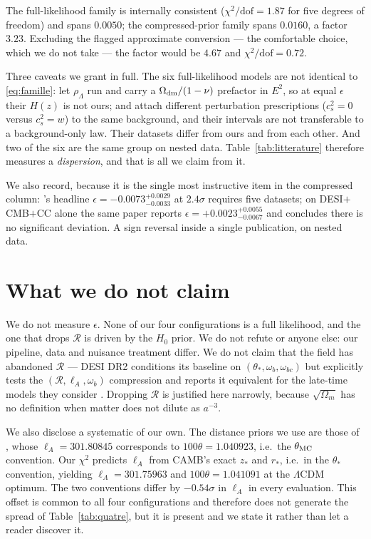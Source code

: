 \documentclass[11pt,a4paper]{article}
\begin{document}
The full-likelihood family is internally consistent ($\chi^2/\mathrm{dof}=1.87$ for five
degrees of freedom) and spans $0.0050$; the compressed-prior family spans $0.0160$, a factor
$3.23$. Excluding the flagged approximate conversion --- the comfortable choice, which we do
not take --- the factor would be $4.67$ and $\chi^2/\mathrm{dof}=0.72$.

Three caveats we grant in full. The six full-likelihood models are not identical to
\eqref{eq:famille}: \citet{tsiapi2019} let $\rho_\Lambda$ run and carry a
$\Omega_{\rm dm}/(1-\nu)$ prefactor in $E^2$, so at equal $\epsilon$ their $H(z)$ is not ours;
\citet{kumar2025} and \citet{yaoliu2025} attach different perturbation prescriptions
($c_s^2=0$ versus $c_s^2=w$) to the same background, and their intervals are not transferable
to a background-only law. Their datasets differ from ours and from each other. And two of the
six are the same group on nested data. Table~\ref{tab:litterature} therefore measures a
\emph{dispersion}, and that is all we claim from it.

We also record, because it is the single most instructive item in the compressed column:
\citet{yang2025}'s headline $\epsilon=-0.0073^{+0.0029}_{-0.0033}$ at $2.4\sigma$ requires
five datasets; on DESI$+$CMB$+$CC alone the same paper reports
$\epsilon=+0.0023^{+0.0055}_{-0.0067}$ and concludes there is no significant deviation. A
sign reversal inside a single publication, on nested data.

\section{What we do not claim}
\label{sec:limites}

We do not measure $\epsilon$. None of our four configurations is a full likelihood, and the
one that drops $\mathcal{R}$ is driven by the $H_0$ prior. We do not refute
\citet{yang2025} or anyone else: our pipeline, data and nuisance treatment differ. We do not
claim that the field has abandoned $\mathcal{R}$ --- DESI DR2 conditions its baseline on
$(\theta_\ast,\omega_b,\omega_{bc})$ but explicitly tests the $(\mathcal{R},\ell_A,\omega_b)$
compression and reports it equivalent for the late-time models they consider
\citep{desidr2}. Dropping $\mathcal{R}$ is justified here narrowly, because $\sqrt{\Omega_m}$
has no definition when matter does not dilute as $a^{-3}$.

We also disclose a systematic of our own. The distance priors we use are those of
\citet{zhaiwang2019}, whose $\ell_A=301.80845$ corresponds to $100\theta=1.040923$, i.e.\ the
$\theta_{\rm MC}$ convention. Our $\chi^2$ predicts $\ell_A$ from CAMB's exact $z_\ast$ and
$r_\ast$, i.e.\ in the $\theta_\ast$ convention, yielding $\ell_A=301.75963$ and
$100\theta=1.041091$ at the $\Lambda$CDM optimum. The two conventions differ by
$-0.54\sigma$ in $\ell_A$ in every evaluation. This offset is common to all four
configurations and therefore does not generate the spread of Table~\ref{tab:quatre}, but it
is present and we state it rather than let a reader discover it.
\end{document}
